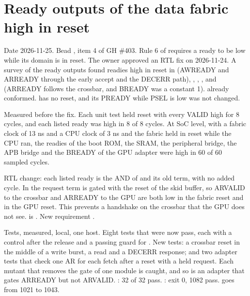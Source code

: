 \section{Ready outputs of the data fabric high in reset}\label{cr:defect:fabric-ready-in-reset}

\begin{record}

Date 2026-11-25. Bead , item 4 of GH \#403. Rule 6 of  requires a ready to be low while its domain is in reset. The owner approved an RTL fix on 2026-11-24. A survey of the ready outputs found readies high in reset in  (AWREADY and ARREADY through the early accept and the DECERR path), , , ,  and  (ARREADY follows the crossbar, and BREADY was a constant 1).  already conformed.  has no reset, and its PREADY while PSEL is low was not changed.

\end{record}

\begin{record}

Measured before the fix. Each unit test held reset with every VALID high for 8 cycles, and each listed ready was high in 8 of 8 cycles. At SoC level, with a fabric clock of 13 ns and a CPU clock of 3 ns and the fabric held in reset while the CPU ran, the readies of the boot ROM, the SRAM, the peripheral bridge, the APB bridge and the BREADY of the GPU adapter were high in 60 of 60 sampled cycles.

\end{record}

\begin{record}

RTL change: each listed ready is the AND of  and its old term, with no added cycle. In  the request term  is gated with the reset of the skid buffer, so ARVALID to the crossbar and ARREADY to the GPU are both low in the fabric reset and in the GPU reset. This prevents a handshake on the crossbar that the GPU does not see.  is . New requirement .

\end{record}

\begin{record}

Tests, measured, local, one host. Eight tests that were  now pass, each with a control after the release and a passing guard for . New tests: a crossbar reset in the middle of a write burst, a read and a DECERR response; and two adapter tests that check one AR for each fetch after a reset with a held request. Each mutant that removes the gate of one module is caught, and so is an adapter that gates ARREADY but not ARVALID. : 32 of 32 pass. : exit 0, 1082 pass.  goes from 1021 to 1043.

\end{record}

